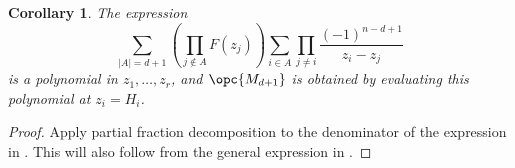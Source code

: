 \documentclass[12pt]{amsart}
\theoremstyle{plain}
\newtheorem{Cor}[Thm]{Corollary}
\theoremstyle{definition}
\theoremstyle{remark}
\begin{document}
\begin{Cor} The expression $$\sum_{|A|=d+1}\left(\prod_{j \not \in A}F(z_j)\right)\sum_{i \in A}\prod_{j \ne i}\frac{(-1)^{n-d+1}}{z_i-z_j}$$ is a polynomial in $z_1,\ldots,z_r$, and $\opc{M_{d+1}}$ is obtained by evaluating this polynomial at $z_i=H_i$.
\end{Cor}
\begin{proof}
Apply partial fraction decomposition to the denominator of the expression in . This will also follow from the general expression in . 
\end{proof}

\end{document}
